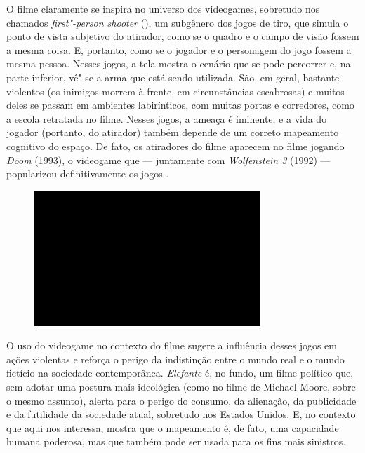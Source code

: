 O filme claramente se inspira no universo dos videogames,
sobretudo nos chamados \emph{first"-person shooter} (), um subgênero
dos jogos de tiro, que simula o ponto de vista subjetivo do atirador,
como se o quadro e o campo de visão fossem a mesma coisa. E, portanto,
como se o jogador e o personagem do jogo fossem a mesma pessoa. Nesses
jogos, a tela mostra o cenário que se pode percorrer e, na parte
inferior, vê"-se a arma que está sendo utilizada. São, em geral, bastante
violentos (os inimigos morrem à frente, em circunstâncias escabrosas) e
muitos deles se passam em ambientes labirínticos, com muitas portas e
corredores, como a escola retratada no filme. Nesses jogos, a ameaça é
iminente, e a vida do jogador (portanto, do atirador) também depende de
um correto mapeamento cognitivo do espaço. De fato, os atiradores do
filme aparecem no filme jogando \emph{Doom} (1993), o videogame que ---
juntamente com \emph{Wolfenstein 3} (1992) --- popularizou
definitivamente os jogos .

\begin{figure}[!ht]

\centering
 \includegraphics[width=85mm]{./imgs/im1.jpg}
\caption{\tiny{}}

\end{figure}


O uso do videogame no contexto do filme sugere a influência
desses jogos em ações violentas e reforça o perigo da indistinção entre
o mundo real e o mundo fictício na sociedade contemporânea.
\emph{Elefante} é, no fundo, um filme político que, sem adotar uma
postura mais ideológica (como no filme de Michael Moore, sobre o mesmo
assunto), alerta para o perigo do consumo, da alienação, da publicidade e
da futilidade da sociedade atual, sobretudo
nos Estados Unidos. E, no contexto que aqui nos interessa, mostra que o
mapeamento é, de fato, uma capacidade humana poderosa, mas que também
pode ser usada para os fins mais sinistros.

